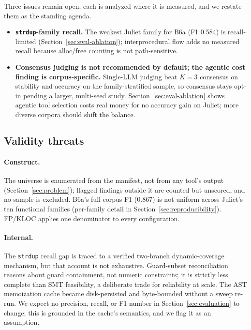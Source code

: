 \documentclass[a4paper]{llncs}
\begin{document}
Three issues remain open; each is analyzed where it is measured, and
we restate them as the standing agenda.

\begin{itemize}
\item \textbf{\texttt{strdup}-family recall.} The weakest Juliet
  family for B6a (F1 0.584) is recall-limited
  (Section~\ref{sec:eval-ablation}); interprocedural flow adds no
  measured recall because alloc/free counting is not path-sensitive.
\item \textbf{Consensus judging is not recommended by default; the
  agentic cost finding is corpus-specific.} Single-LLM judging beat
  $K{=}3$ consensus on stability and accuracy on the
  family-stratified sample, so consensus stays opt-in pending a larger,
  multi-seed study. Section~\ref{sec:eval-ablation} shows agentic
  tool selection costs real money for no accuracy gain on Juliet;
  more diverse corpora should shift the balance.
\end{itemize}

\subsection{Validity threats}
\paragraph{Construct.}
The universe is enumerated from the manifest, not
from any tool's output (Section~\ref{sec:problem}); flagged findings
outside it are counted but unscored, and no sample is excluded.
B6a's
full-corpus F1 (0.867) is not uniform across Juliet's ten functional
families (per-family detail in Section~\ref{sec:reproducibility}).
FP/KLOC applies one denominator to every configuration.

\paragraph{Internal.}
The \texttt{strdup} recall gap is traced to a
verified two-branch dynamic-coverage mechanism, but that account is not
exhaustive. Guard-subset reconciliation reasons about guard containment,
not numeric constraints; it is strictly less complete than SMT
feasibility, a deliberate trade for reliability at scale. The AST
memoization cache became disk-persisted and byte-bounded without a sweep
re-run. We expect no precision, recall, or F1 number in
Section~\ref{sec:evaluation} to change; this is grounded in the
cache's semantics, and we flag it as an assumption.
\end{document}
